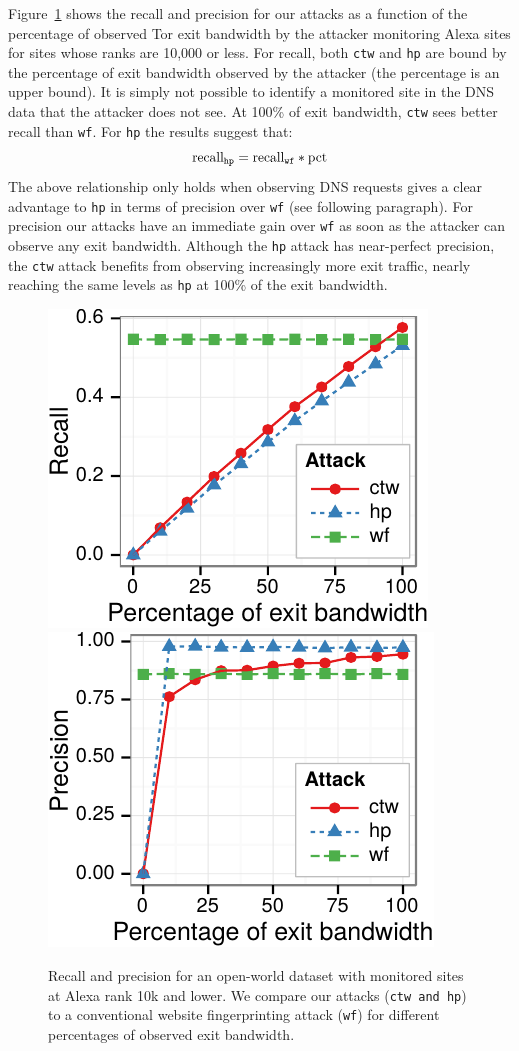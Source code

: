Figure~\ref{fig:fpt:torpct} shows the recall and precision for our \name
attacks as a function of the percentage of observed Tor exit bandwidth by the
attacker monitoring Alexa sites for sites whose ranks are 10,000 or less.
For recall, both \texttt{ctw} and \texttt{hp} are bound by the
percentage of exit bandwidth observed by the attacker (the percentage is an
upper bound).
It is simply not possible to identify a monitored site in the DNS data that
the attacker does not see. At 100\% of exit bandwidth, \texttt{ctw} sees
better recall than \texttt{wf}. For \texttt{hp} the results suggest that:
\begin{equation}
	\label{eq:hprecall}
	\textnormal{recall}_{\texttt{hp}} = \textnormal{recall}_{\texttt{wf}} * \textnormal{pct}
\end{equation}
The above relationship only holds when observing DNS requests gives
a clear advantage to \texttt{hp} in terms of precision over \texttt{wf} (see
following paragraph).
For precision our attacks have an immediate gain over \texttt{wf} as soon as
the attacker can observe {any exit bandwidth}.
Although the \texttt{hp} attack has near-perfect precision, the
\texttt{ctw} attack benefits from observing increasingly more exit traffic,
nearly reaching the same levels as \texttt{hp} at 100\% of the exit bandwidth.


\begin{figure}[t]
\centering
	\includegraphics[width=0.465\linewidth]{figures/fpt/pct/1kx100+100k-recall-ggplot2}
	\includegraphics[width=0.465\linewidth]{figures/fpt/pct/1kx100+100k-precision-ggplot2}
\caption{Recall and precision for an open-world dataset with monitored sites
at Alexa rank 10k and lower. We compare our \name attacks (\texttt{ctw and
 \texttt{hp}}) to a conventional website fingerprinting attack (\texttt{wf}) for different
 percentages of observed exit bandwidth. }
\label{fig:fpt:torpct}
\end{figure}


